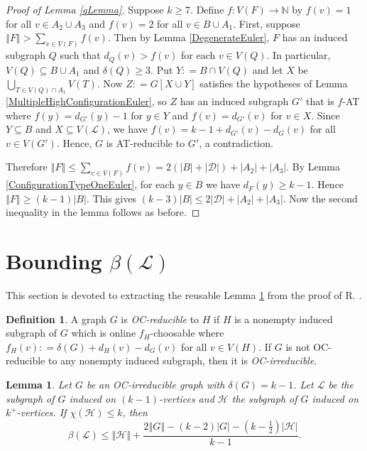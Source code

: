 \documentclass[10pt]{article}
\theoremstyle{plain}
\newtheorem{lem}[thm]{Lemma}
\theoremstyle{definition}
\newtheorem{defn}{Definition}
\theoremstyle{remark}
\newcommand{\fancy}[1]{\mathcal{#1}}
\newcommand{\IN}{\mathbb{N}}
\newcommand{\D}{\fancy{D}}
\renewcommand{\L}{\fancy{L}}
\newcommand{\HH}{\fancy{H}}
\newcommand{\card}[1]{\left|#1\right|}
\newcommand{\size}[1]{\left\Vert#1\right\Vert}
\newcommand{\func}[3]{#1\colon #2 \rightarrow #3}
\newcommand{\parens}[1]{\left( #1 \right)}
\newcommand{\DefinedAs}{\mathrel{\mathop:}=}
\def\D{\fancy{D}}
\begin{document}
\begin{proof}[Proof of Lemma \ref{qLemma}]
Suppose $k \ge 7$.  Define $\func{f}{V(F)}{\IN}$ by $f(v) = 1$ for all $v \in A_2 \cup A_3$ and $f(v) = 2$ for all $v \in B \cup A_1$.  First, suppose $\size{F} > \sum_{v \in V(F)} f(v)$.  
Then by Lemma \ref{DegenerateEuler}, $F$ has an induced subgraph $Q$ such that $d_Q(v) > f(v)$ for each $v \in V(Q)$.  
In particular, $V(Q) \subseteq B \cup A_1$ and $\delta(Q) \ge 3$.  Put $Y \DefinedAs B \cap V(Q)$ and let $X$ be $\bigcup_{T \in V(Q) \cap A_1} V(T)$. 
Now $Z \DefinedAs G[X \cup Y]$ satisfies the hypotheses of Lemma \ref{MultipleHighConfigurationEuler}, so $Z$ has an induced subgraph $G'$ that is $f$-AT 
where $f(y) = d_{G'}(y) - 1$ for $y \in Y$ and $f(v) = d_{G'}(v)$ for $v \in X$.  Since $Y \subseteq B$ and $X \subseteq V(\L)$, we have $f(v) = k-1 + d_{G'}(v) - d_G(v)$ for all $v \in V(G')$.  
Hence, $G$ is AT-reducible to $G'$, a contradiction.

Therefore $\size{F} \leq \sum_{v \in V(F)} f(v) = 2(\card{B} + \card{\D}) + \card{A_2} + \card{A_3}$. 
By Lemma \ref{ConfigurationTypeOneEuler}, for each $y \in B$ we have $d_F(y) \ge k-1$.  
Hence $\size{F} \ge (k-1)\card{B}$.  This gives $(k-3)\card{B} \leq 2\card{\D} + \card{A_2} + \card{A_3}$.  
Now the second inequality in the lemma follows as before.
\end{proof}

\section{Bounding $\beta(\L)$}
This section is devoted to extracting the reusable Lemma \ref{betaLemma} from the proof of R. \cite{4ListCritical}.

\begin{defn} A graph $G$ is \emph{OC-reducible} to $H$ if $H$ is a nonempty induced
subgraph of $G$ which is online $f_{H}$-choosable where $f_{H}(v)\DefinedAs\delta(G)+d_{H}(v)-d_{G}(v)$
for all $v\in V(H)$. If $G$ is not OC-reducible to any nonempty induced subgraph,
then it is \emph{OC-irreducible}. 
\end{defn}

\begin{lem}\label{betaLemma}
	Let $G$ be an OC-irreducible graph with $\delta(G) = k-1$.  Let $\L$ be the subgraph of $G$ induced on $(k-1)$-vertices and	$\HH$ the subgraph of $G$ induced on $k^+$-vertices.  
	If $\chi(\HH) \le k$, then
	\[\beta(\L) \le \size{\HH} + \frac{2\size{G} - (k-2)\card{G} - \parens{k - \frac12}\card{\HH}}{k-1}.\]
\end{lem}
\end{document}
